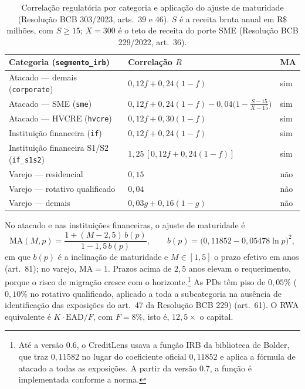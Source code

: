 \documentclass[11pt,a4paper]{article}
\begin{document}
\begin{table}[htb]
\centering\small
\caption{Correlação regulatória por categoria e aplicação do ajuste de maturidade (Resolução BCB 303/2023, arts.~39 e 46). $S$ é a receita bruta anual em R\$ milhões, com $S\ge15$; $X=300$ é o teto de receita do porte SME (Resolução BCB 229/2022, art.~36).}
\label{tab:irb-cat}
\setlength{\tabcolsep}{4pt}
\begin{tabular}{lll}
\toprule
Categoria (\texttt{segmento\_irb}) & Correlação $R$ & MA \\
\midrule
Atacado --- demais (\texttt{corporate}) & $0{,}12f+0{,}24(1-f)$ & sim \\
Atacado --- SME (\texttt{sme}) & $0{,}12f+0{,}24(1-f)-0{,}04\bigl(1-\frac{S-15}{X-15}\bigr)$ & sim \\
Atacado --- HVCRE (\texttt{hvcre}) & $0{,}12f+0{,}30(1-f)$ & sim \\
Instituição financeira (\texttt{if}) & $0{,}12f+0{,}24(1-f)$ & sim \\
Instituição financeira S1/S2 (\texttt{if\_s1s2}) & $1{,}25\,[0{,}12f+0{,}24(1-f)]$ & sim \\
Varejo --- residencial & $0{,}15$ & não \\
Varejo --- rotativo qualificado & $0{,}04$ & não \\
Varejo --- demais & $0{,}03g+0{,}16(1-g)$ & não \\
\bottomrule
\end{tabular}
\end{table}

No atacado e nas instituições financeiras, o ajuste de maturidade é
\begin{equation}
\mathrm{MA}(M,p)=\frac{1+(M-2{,}5)\,b(p)}{1-1{,}5\,b(p)},
\qquad
b(p)=\bigl(0{,}11852-0{,}05478\ln p\bigr)^2,
\end{equation}
em que $b(p)$ é a inclinação de maturidade e $M\in[1,5]$ o prazo efetivo em anos (art.~81); no varejo, $\mathrm{MA}=1$. Prazos acima de $2{,}5$ anos elevam o requerimento, porque o risco de migração cresce com o horizonte.\footnote{Até a versão 0.6, o CreditLens usava a função IRB da biblioteca de Bolder, que traz $0{,}11582$ no lugar do coeficiente oficial $0{,}11852$ e aplica a fórmula de atacado a todas as exposições. A partir da versão 0.7, a função é implementada conforme a norma.} As PDs têm piso de $0{,}05\%$ ($0{,}10\%$ no rotativo qualificado, aplicado a toda a subcategoria na ausência de identificação das exposições do art.~47 da Resolução BCB 229) (art.~61). O RWA equivalente é $K\cdot\mathrm{EAD}/F$, com $F=8\%$, isto é, $12{,}5\times$ o capital.
\end{document}
